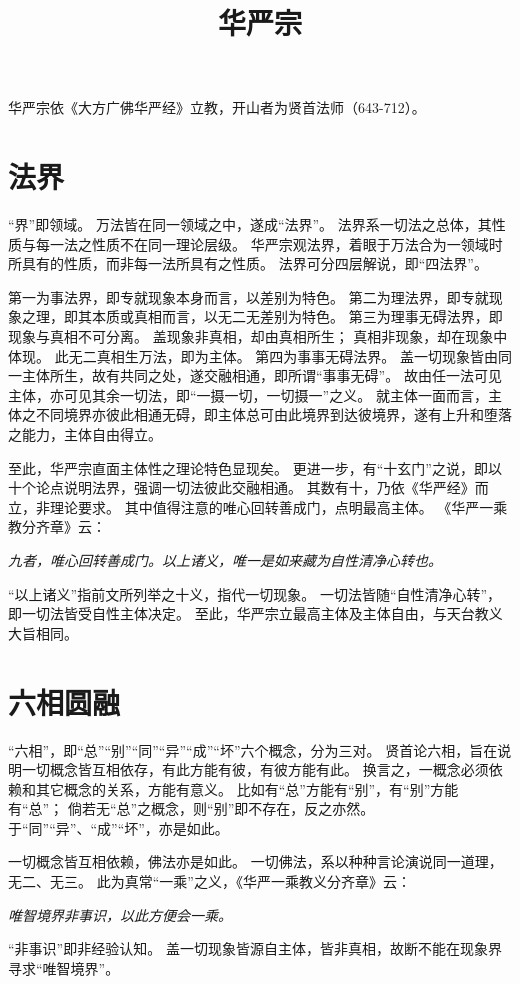 \documentclass[11pt]{article}
\title{华严宗}
\date{}
\begin{document}
  \maketitle

  \linenumbers

华严宗依《大方广佛华严经》立教，开山者为贤首法师（643-712）。

\section{法界}
“界”即领域。
万法皆在同一领域之中，遂成“法界”。
法界系一切法之总体，其性质与每一法之性质不在同一理论层级。
华严宗观法界，着眼于万法合为一领域时所具有的性质，而非每一法所具有之性质。
法界可分四层解说，即“四法界”。

\newline

第一为事法界，即专就现象本身而言，以差别为特色。
第二为理法界，即专就现象之理，即其本质或真相而言，以无二无差别为特色。
第三为理事无碍法界，即现象与真相不可分离。
盖现象非真相，却由真相所生；
真相非现象，却在现象中体现。
此无二真相生万法，即为主体。
第四为事事无碍法界。
盖一切现象皆由同一主体所生，故有共同之处，遂交融相通，即所谓“事事无碍”。
故由任一法可见主体，亦可见其余一切法，即“一摄一切，一切摄一”之义。
就主体一面而言，主体之不同境界亦彼此相通无碍，即主体总可由此境界到达彼境界，遂有上升和堕落之能力，主体自由得立。

\newline

至此，华严宗直面主体性之理论特色显现矣。
更进一步，有“十玄门”之说，即以十个论点说明法界，强调一切法彼此交融相通。
其数有十，乃依《华严经》而立，非理论要求。
其中值得注意的唯心回转善成门，点明最高主体。
《华严一乘教分齐章》云：

\textit{九者，唯心回转善成门。以上诸义，唯一是如来藏为自性清净心转也。}

“以上诸义”指前文所列举之十义，指代一切现象。
一切法皆随“自性清净心转”，即一切法皆受自性主体决定。
至此，华严宗立最高主体及主体自由，与天台教义大旨相同。

\section{六相圆融}
“六相”，即“总”“别”“同”“异”“成”“坏”六个概念，分为三对。
贤首论六相，旨在说明一切概念皆互相依存，有此方能有彼，有彼方能有此。
换言之，一概念必须依赖和其它概念的关系，方能有意义。
比如有“总”方能有“别”，有“别”方能有“总”；
倘若无“总”之概念，则“别”即不存在，反之亦然。
于“同”“异”、“成”“坏”，亦是如此。

\newline

一切概念皆互相依赖，佛法亦是如此。
一切佛法，系以种种言论演说同一道理，无二、无三。
此为真常“一乘”之义，《华严一乘教义分齐章》云：

\textit{唯智境界非事识，以此方便会一乘。}

“非事识”即非经验认知。
盖一切现象皆源自主体，皆非真相，故断不能在现象界寻求“唯智境界”。  
  
\end{document}
